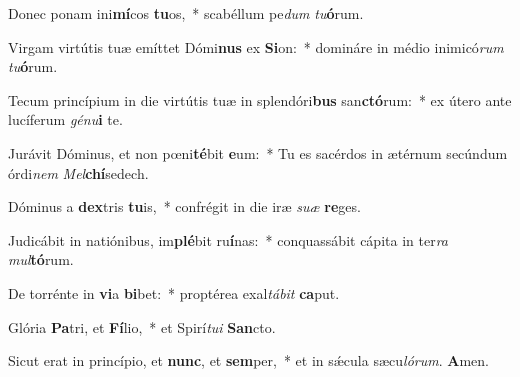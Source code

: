 \item Donec ponam ini\textbf{mí}cos \textbf{tu}os,~* scabéllum pe\textit{dum} \textit{tu}\textbf{ó}rum.

\item Virgam virtútis tuæ emíttet Dómi\textbf{nus} ex \textbf{Si}on:~* domináre in médio inimicó\textit{rum} \textit{tu}\textbf{ó}rum.

\item Tecum princípium in die virtútis tuæ in splendóri\textbf{bus} san\textbf{ctó}rum:~* ex útero ante lucíferum \textit{gé}\textit{nu}\textbf{i} te.

\item Jurávit Dóminus, et non pœni\textbf{té}bit \textbf{e}um:~* Tu es sacérdos in ætérnum secúndum órdi\textit{nem} \textit{Mel}\textbf{chí}sedech.

\item Dóminus a \textbf{dex}tris \textbf{tu}is,~* confrégit in die iræ \textit{su}\textit{æ} \textbf{re}ges.

\item Judicábit in natiónibus, im\textbf{plé}bit ru\textbf{í}nas:~* conquassábit cápita in ter\textit{ra} \textit{mul}\textbf{tó}rum.

\item De torrénte in \textbf{vi}a \textbf{bi}bet:~* proptérea exal\textit{tá}\textit{bit} \textbf{ca}put.

\item Glória \textbf{Pa}tri, et \textbf{Fí}lio,~* et Spirí\textit{tu}\textit{i} \textbf{San}cto.

\item Sicut erat in princípio, et \textbf{nunc}, et \textbf{sem}per,~* et in sǽcula sæcu\textit{ló}\textit{rum}. \textbf{A}men.
